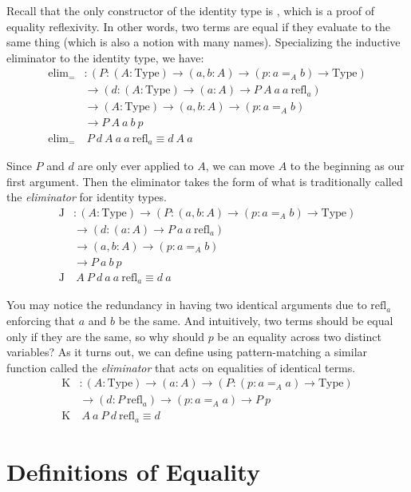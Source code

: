 \documentclass{report}
\newcommand{\const}[1]{\text{#1}}
\newcommand{\Type}{\const{Type}}
\newcommand{\elim}{\const{elim}}
\newcommand{\refl}{\const{refl}}
\newcommand{\jelim}{\const{J}\xspace}
\newcommand{\kelim}{\const{K}\xspace}
\begin{document}
Recall that the only constructor of the identity type is \refl, which is a proof of equality reflexivity. In other words, two terms are equal if they evaluate to the same thing (which is also a notion with many names). Specializing the inductive eliminator to the identity type, we have:
%
\begin{align*}
    \elim_= &: (P : (A : \Type) \to (a, b : A) \to (p : a =_A b) \to \Type) \\
    &\to (d : (A : \Type) \to (a : A) \to P ~ A ~ a ~ a ~ \refl_a) \\
    &\to (A : \Type) \to (a, b : A) \to (p : a =_A b) \\
    &\to P ~ A ~ a ~ b ~ p \\
    \elim_= &~ P ~ d ~ A ~ a ~ a ~ \refl_a \equiv d ~ A ~ a
\end{align*}

Since $P$ and $d$ are only ever applied to $A$, we can move $A$ to the beginning as our first argument. Then the eliminator takes the form of what is traditionally called the \emph{\jelim eliminator} for identity types.
%
\begin{align*}
    \jelim &: (A : \Type) \to (P : (a, b : A) \to (p : a =_A b) \to \Type) \\
    &\to (d : (a : A) \to P ~ a ~ a ~ \refl_a) \\
    &\to (a, b : A) \to (p : a =_A b) \\
    &\to P ~ a ~ b ~ p \\
    \jelim &~ A ~ P ~ d ~ a ~ a ~ \refl_a \equiv d ~ a
\end{align*}

You may notice the redundancy in having two identical arguments due to $\refl_a$ enforcing that $a$ and $b$ be the same. And intuitively, two terms should be equal only if they are the same, so why should $p$ be an equality across two distinct variables? As it turns out, we can define using pattern-matching a similar function called the \emph{\kelim eliminator} that acts on equalities of identical terms.
%
\begin{align*}
    \kelim & : (A : \Type) \to (a : A) \to (P : (p : a =_A a) \to \Type) \\
    &\to (d : P ~ \refl_a) \to (p : a =_A a) \to P ~ p \\
    \kelim &~ A ~ a ~ P ~ d ~ \refl_a \equiv d
\end{align*}

\section{Definitions of Equality}
\end{document}
